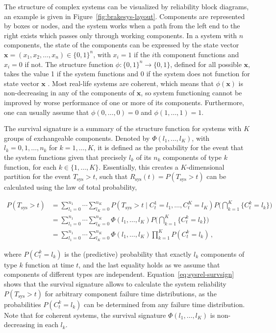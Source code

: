 \documentclass[Journal,letterpaper]{ascelike-new}
\renewcommand{\vec}[1]{{\bm#1}}
\newcommand{\Rsys}{R_\text{sys}}
\def\Rsys{R_\text{sys}}
\def\Tsys{T_\text{sys}}
\begin{document}
The structure of complex systems can be visualized by reliability block diagrams,
an example is given in Figure~\ref{fig:brakesys-layout}.
Components are represented by boxes or nodes,
and the system works when a path from the left end to the right exists
which passes only through working components.
In a system with $n$ components, the state of the components can be expressed by the state vector
$\vec{x} = (x_1,x_2,\ldots,x_n) \in \{0,1\}^n$, with $x_i=1$ if the $i$th component functions 
and $x_i=0$ if not.
The structure function $\phi : \{0,1\}^n \rightarrow \{0,1\}$, defined for all possible $\vec{x}$, takes 
the value 1 if the system functions and 0 if the system does not function for state vector $\vec{x}$
\cite{BP75}.
Most real-life systems are coherent,
which means that $\phi(\vec{x})$ is non-decreasing in any of the components of $\vec{x}$,
so system functioning cannot be improved by worse performance of one or more of its components.
Furthermore, one can usually assume that $\phi(0, \ldots, 0) = 0$ and $\phi(1, \ldots, 1) = 1$.

The survival signature \cite{2012:survsign} is a summary of the structure function
for systems with $K$ groups of exchangeable components.
Denoted by $\Phi(l_1,\ldots,l_K)$, with $l_k=0,1,\ldots,n_k$ for $k=1,\ldots,K$,
it is defined as the probability for the event that the system functions
given that precisely $l_k$ of its $n_k$ components of type $k$ function, for each $k\in \{1,\ldots,K\}$.
Essentially, this creates a $K$-dimensional partition for the event $\Tsys > t$,
such that $\Rsys(t) = P(\Tsys > t)$ can be calculated using the law of total probability,
\begin{linenomath*}
\begin{align}
P(\Tsys > t) &= \sum_{l_1=0}^{n_1} \cdots \sum_{l_K=0}^{n_K} P(\Tsys > t \mid C^1_t = l_1,\ldots, C^K_t = l_K)
                                                                                  P\Big( \bigcap_{k=1}^K \{ C^k_t = l_k\} \Big) \nonumber\\
             &= \sum_{l_1=0}^{n_1} \cdots \sum_{l_K=0}^{n_K} \Phi(l_1,\ldots,l_K) P\Big( \bigcap_{k=1}^K \{ C^k_t = l_k\} \Big) \nonumber\\
             &= \sum_{l_1=0}^{n_1} \cdots \sum_{l_K=0}^{n_K} \Phi(l_1,\ldots,l_K) \prod_{k=1}^K P(C^k_t = l_k)\,,
\label{eq:sysrel-survsign}
\end{align}
\end{linenomath*}
where $P(C^k_t = l_k)$ is the (predictive) probability that exactly $l_k$ components of type $k$ function at time $t$,
and the last equality holds as we assume that components of different types are independent.
Equation~\ref{eq:sysrel-survsign} shows that the survival signature allows to calculate the system reliability $P(\Tsys > t)$
for arbitrary component failure time distributions,
as the probabilities $P(C^k_t = l_k)$ can be determined from any failure time distribution.
Note that for coherent systems,
the survival signature $\Phi(l_1,\ldots,l_K)$ is non-decreasing in each $l_k$.
\end{document}
